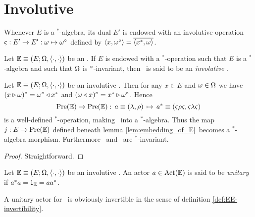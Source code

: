 
\section{Involutive \contexts}
\label{par:involutive contexts}

Whenever $E$ is a $^*$-algebra, its dual $E'$ is endowed with an involutive
operation $\varsigma : E' \rightarrow E' : \omega \mapsto \omega^\circ$ defined by
$\langle x,\omega^\circ \rangle = \overline{\langle x^*,\omega \rangle}$.


\begin{defn_sec}
Let $\mathbb{E} \equiv (E; \Omega, \langle\cdot, \cdot\rangle)$ be an \context\@.
If $E$ is endowed with a $^*$-operation such that $E$ is a $^*$-algebra and such that
$\Omega$ is $^\circ$-invariant, then \EE\ is said to be an {\em involutive\/} \context\@.
\end{defn_sec}



\begin{lemma_sec}
Let\/ $\mathbb{E} \equiv (E; \Omega, \langle\cdot, \cdot\rangle)$ be an involutive \context\@.
Then for any\/ $x\in E$ and\/ $\omega \in \Omega$ we have\/
$(x \triangleright \omega)^\circ = \omega^\circ \triangleleft x^*$ and\/ $(\omega \triangleleft x)^\circ = x^* \triangleright \omega^\circ$.
Hence
\begin{equation}\label{eq:def:star_of_actor}
   \mbox{\rm Pre}(\mathbb{E}) \rightarrow \mbox{\rm Pre}(\mathbb{E}) : \, a\equiv (\lambda,\rho) \,\mapsto\,
                a^* \equiv (\varsigma \rho \varsigma, \varsigma \lambda \varsigma)
\end{equation}
is a well-defined\/ $^*$-operation, making\/ \PreE\ into a\/ $^*$-algebra.
Thus the map\/ $j:E \rightarrow \mbox{\rm Pre}(\mathbb{E})$ defined beneath lemma \ref{lem:embedding_of_E}\
becomes a\/ $^*$-algebra morphism.
Furthermore\/ \ActE\ and\/ \EnvE\ are $^*$-invariant.
\end{lemma_sec}
\begin{proof}
Straightforward.
\end{proof}



\begin{defn_sec}  \label{def:unitary_actor}
Let $\mathbb{E} \equiv (E; \Omega, \langle\cdot, \cdot\rangle)$ be an involutive \context\@.
An actor $a\in \mbox{\rm Act}(\mathbb{E})$ is said to be {\em unitary\/} if $a^* a = 1_{\mathbb{E}} = a a^*$.
\end{defn_sec}

A unitary actor for \EE\ is obviously \EEdash invertible in the sense of
definition \ref{def:EE-invertibility}\@.


